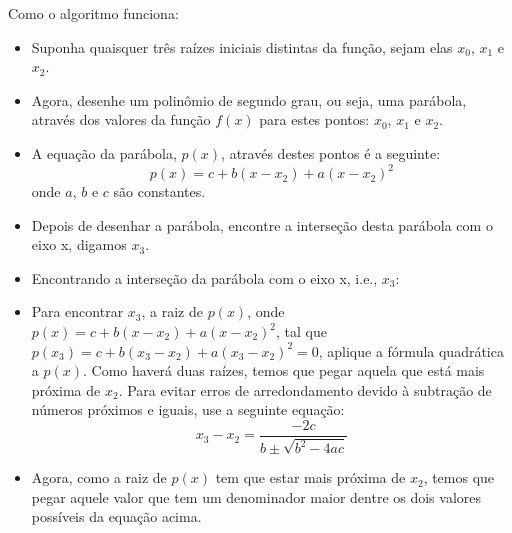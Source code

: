 \documentclass[12pt]{article}
\begin{document}
Como o algoritmo funciona:
\begin{itemize}
    \item Suponha quaisquer três raízes iniciais distintas da função, sejam elas \(x_0\), \(x_1\) e \(x_2\).
    \item Agora, desenhe um polinômio de segundo grau, ou seja, uma parábola, através dos valores da função \(f(x)\) para estes pontos: \(x_0\), \(x_1\) e \(x_2\).

    \item A equação da parábola, \(p(x)\), através destes pontos é a seguinte:
    \[ p(x) = c + b(x - x_2) + a(x - x_2)^2 \]
    onde \(a\), \(b\) e \(c\) são constantes.
    \item Depois de desenhar a parábola, encontre a interseção desta parábola com o eixo x, digamos \(x_3\).

    \item Encontrando a interseção da parábola com o eixo x, i.e., \(x_3\):
    \item Para encontrar \(x_3\), a raiz de \(p(x)\), onde \(p(x) = c + b(x - x_2) + a(x - x_2)^2\), tal que \(p(x_3) = c + b(x_3 - x_2) + a(x_3 - x_2)^2 = 0\), aplique a fórmula quadrática a \(p(x)\). Como haverá duas raízes, temos que pegar aquela que está mais próxima de \(x_2\). Para evitar erros de arredondamento devido à subtração de números próximos e iguais, use a seguinte equação:
    \[ x_3 - x_2 = \frac{-2c}{b \pm \sqrt{b^2 - 4ac}} \]
    \item Agora, como a raiz de \(p(x)\) tem que estar mais próxima de \(x_2\), temos que pegar aquele valor que tem um denominador maior dentre os dois valores possíveis da equação acima.


\end{itemize}
\end{document}
